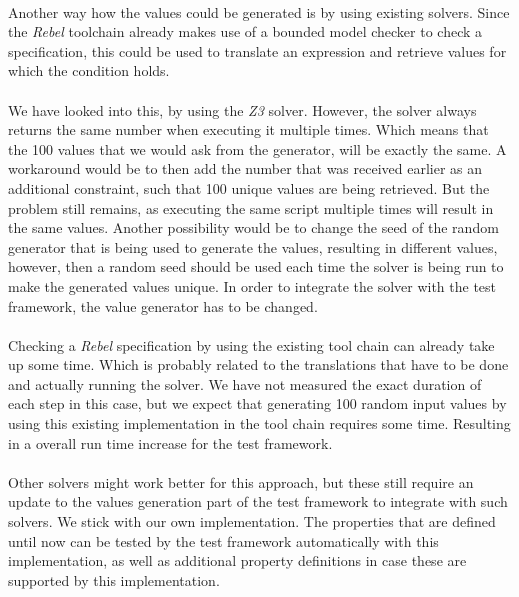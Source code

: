 \\
Another way how the values could be generated is by using existing solvers.
Since the \textit{Rebel} toolchain already makes
use of a bounded model checker to check a specification, this could be used to
translate an expression and retrieve values for which the condition holds.\\
\\
We have looked into this, by using the \textit{Z3} solver. However, the solver
always returns the same number when executing it multiple times. Which means
that the 100 values that we would ask from the generator, will be exactly the
same. A workaround would be to then add the number that was received earlier as
an additional constraint, such that 100 unique values are being retrieved. But
the problem still remains, as executing the same script multiple times will
result in the same values. Another possibility would be to change the seed of
the random generator that is being used to generate the values, resulting in
different values, however, then a random seed should be used each time the
solver is being run to make the generated values unique. In order to integrate
the solver with the test framework, the value generator has to be changed.\\
\\
Checking a \textit{Rebel} specification by using the existing tool chain can already take up some time. Which is probably
related to the translations that have to be done and actually running the
solver. We have not measured the exact duration of each step in this case, but
we expect that generating 100 random input values by using this existing implementation in the tool chain
requires some time. Resulting in a overall run time increase for the test
framework.\\
\\
Other solvers might work better for this approach, but these still require an
update to the values generation part of the test framework to integrate with
such solvers. We stick with our own implementation. The properties that are defined until now can be tested by the test framework automatically with this implementation, as well as additional property definitions in case these are supported by this implementation.

